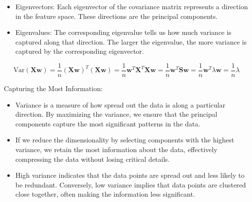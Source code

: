 \begin{itemize}
	\item Eigenvectors: Each eigenvector of the covariance matrix represents a direction in the feature space. These directions are the principal components.
	\item Eigenvalues: The corresponding eigenvalue tells us how much variance is captured along that direction. The larger the eigenvalue, the more variance is captured by the corresponding eigenvector.
\end{itemize}

\[
\text{Var}(\mathbf{X}\mathbf{w}) = \frac{1}{n} (\mathbf{X}\mathbf{w})^T (\mathbf{X}\mathbf{w}) = \frac{1}{n} \mathbf{w}^T \mathbf{X}^T \mathbf{X} \mathbf{w} = \frac{1}{n} \mathbf{w}^T \mathbf{S} \mathbf{w} = \frac{1}{n} \mathbf{w}^T \lambda \mathbf{w} = \frac{1}{n} \lambda
\]

Capturing the Most Information:

\begin{itemize}
	\item Variance is a measure of how spread out the data is along a particular direction. By maximizing the variance, we ensure that the principal components capture the most significant patterns in the data.
	\item If we reduce the dimensionality by selecting components with the highest variance, we retain the most information about the data, effectively compressing the data without losing critical details.
	\item High variance indicates that the data points are spread out and less likely to be redundant. Conversely, low variance implies that data points are clustered close together, often making the information less significant.
\end{itemize}


